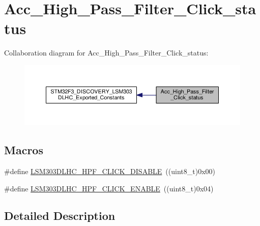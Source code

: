 \hypertarget{group__Acc__High__Pass__Filter__Click__status}{\section{Acc\+\_\+\+High\+\_\+\+Pass\+\_\+\+Filter\+\_\+\+Click\+\_\+status}
\label{group__Acc__High__Pass__Filter__Click__status}
}
Collaboration diagram for Acc\+\_\+\+High\+\_\+\+Pass\+\_\+\+Filter\+\_\+\+Click\+\_\+status\+:\nopagebreak
\begin{figure}[H]
\begin{center}
\leavevmode
\includegraphics[width=350pt]{group__Acc__High__Pass__Filter__Click__status}
\end{center}
\end{figure}
\subsection*{Macros}
\begin{DoxyCompactItemize}
\item 
\#define \hyperlink{group__Acc__High__Pass__Filter__Click__status_ga52e2b6a805ede64d4b422b55ed2cb982}{L\+S\+M303\+D\+L\+H\+C\+\_\+\+H\+P\+F\+\_\+\+C\+L\+I\+C\+K\+\_\+\+D\+I\+S\+A\+B\+L\+E}~((uint8\+\_\+t)0x00)
\item 
\#define \hyperlink{group__Acc__High__Pass__Filter__Click__status_gaee61994d626ce322196bcee454c6ee6c}{L\+S\+M303\+D\+L\+H\+C\+\_\+\+H\+P\+F\+\_\+\+C\+L\+I\+C\+K\+\_\+\+E\+N\+A\+B\+L\+E}~((uint8\+\_\+t)0x04)
\end{DoxyCompactItemize}


\subsection{Detailed Description}


